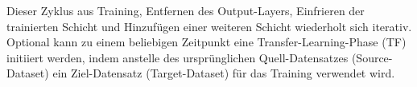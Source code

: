 Dieser Zyklus aus Training, Entfernen des Output-Layers, Einfrieren der trainierten Schicht und Hinzufügen einer weiteren Schicht wiederholt sich 
iterativ. Optional kann zu einem beliebigen Zeitpunkt eine Transfer-Learning-Phase (TF) initiiert werden, indem anstelle des ursprünglichen 
Quell-Datensatzes (Source-Dataset) ein Ziel-Datensatz (Target-Dataset) für das Training verwendet wird.
